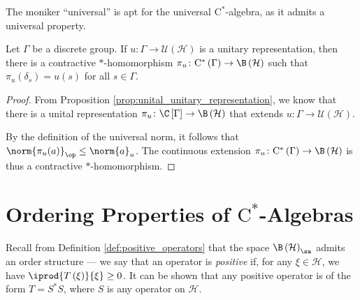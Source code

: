 The moniker ``universal'' is apt for the universal $\mathrm{C}^{\ast}$-algebra, as it admits a universal property.
\begin{theorem}
  Let $\Gamma$ be a discrete group. If $u\colon \Gamma\rightarrow \mathcal{U}\left( \mathcal{H} \right)$ is a unitary representation, then there is a contractive $\ast$-homomorphism $\pi_u\colon \mathrm{C}^{\ast}\left( \Gamma \right)\rightarrow \B\left( \mathcal{H} \right)$ such that $\pi_u\left( \delta_s \right) = u(s)$ for all $s\in\Gamma$.
  \begin{center}
  \end{center}
\end{theorem}
\begin{proof}
  From Proposition \ref{prop:unital_unitary_representation}, we know that there is a unital representation $\pi_u\colon \C\left[ \Gamma \right]\rightarrow \B\left( \mathcal{H} \right)$ that extends $u\colon \Gamma\rightarrow \mathcal{U}\left( \mathcal{H} \right)$.\newline

  By the definition of the universal norm, it follows that $\norm{\pi_u(a)}_{\op}\leq \norm{a}_{u}$. The continuous extension $\pi_u\colon \mathrm{C}^{\ast}\left( \Gamma \right)\rightarrow \B\left( \mathcal{H} \right)$ is thus a contractive $\ast$-homomorphism.
\end{proof}
\section{Ordering Properties of \texorpdfstring{$\mathrm{C}^{\ast}$-Algebras}{C*-Algebras}}%
Recall from Definition \ref{def:positive_operators} that the space $\B\left( \mathcal{H} \right)_{\sa}$ admits an order structure --- we say that an operator is \textit{positive} if, for any $\xi\in \mathcal{H}$, we have $ \iprod{T\left( \xi \right)}{\xi} \geq 0 $. It can be shown that any positive operator is of the form $T = S^{\ast}S$, where $S$ is any operator on $\mathcal{H}$.\newline

